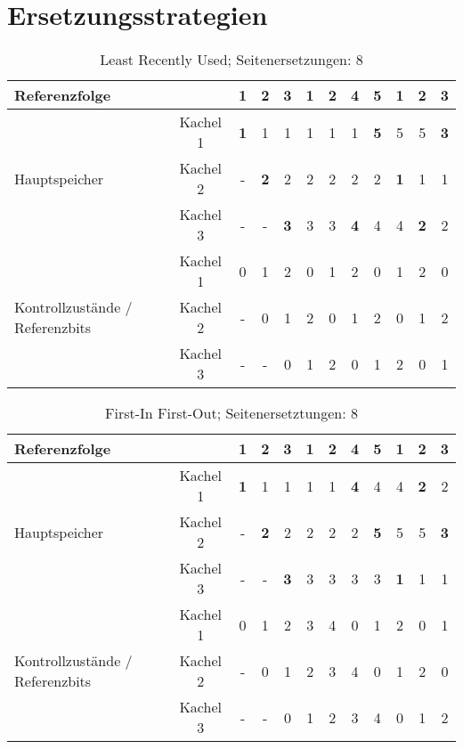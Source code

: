 \documentclass[DIN, pagenumber=false, fontsize=11pt, parskip=half]{scrartcl}
\begin{document}
    \section{Ersetzungsstrategien}
    \begin{table}[H]
        \centering
        \begin{tabular}{lc|c|c|c|c|c|c|c|c|c|c}
            \toprule
            Referenzfolge & & 1 & 2 & 3 & 1 & 2 & 4 & 5 & 1 & 2 & 3 \\
            \midrule
            \multirow{3}{*}{Hauptspeicher} & Kachel 1  & \textbf{1} & 1 & 1 & 1 & 1 & 1 & \textbf{5} & 5 & 5 & \textbf{3}\\
            & Kachel 2 & - & \textbf{2} & 2 & 2 & 2 & 2 & 2 & \textbf{1} & 1 & 1\\
            & Kachel 3 & - & - & \textbf{3} & 3 & 3 & \textbf{4} & 4 & 4 & \textbf{2} & 2\\
            \midrule
            \multirow{3}{3cm}{Kontrollzustände / Referenzbits} & Kachel 1 & 0 & 1 & 2 & 0 & 1 & 2 & 0 & 1 & 2 & 0\\
            & Kachel 2 & - & 0 & 1 & 2 & 0 & 1 & 2 & 0 & 1 & 2\\
            & Kachel 3 & - & - & 0 & 1 & 2 & 0 & 1 & 2 & 0 & 1\\
            \bottomrule
        \end{tabular}
        \caption{Least Recently Used; Seitenersetzungen: 8}
    \end{table}
    \begin{table}[H]
        \centering
        \begin{tabular}{lc|c|c|c|c|c|c|c|c|c|c}
            \toprule
            Referenzfolge & & 1 & 2 & 3 & 1 & 2 & 4 & 5 & 1 & 2 & 3 \\
            \midrule
            \multirow{3}{*}{Hauptspeicher} & Kachel 1  & \textbf{1} & 1 & 1 & 1 & 1 & \textbf{4} & 4 & 4 & \textbf{2} & 2\\
            & Kachel 2 & - & \textbf{2} & 2 & 2 & 2 & 2 & \textbf{5} & 5 & 5 & \textbf{3}\\
            & Kachel 3 & - & - & \textbf{3} & 3 & 3 & 3 & 3 & \textbf{1} & 1 & 1\\
            \midrule
            \multirow{3}{3cm}{Kontrollzustände / Referenzbits} & Kachel 1 & 0 & 1 & 2 & 3 & 4 & 0 & 1 & 2 & 0 & 1\\
            & Kachel 2 & - & 0 & 1 & 2 & 3 & 4 & 0 & 1 & 2 & 0\\
            & Kachel 3 & - & - & 0 & 1 & 2 & 3 & 4 & 0 & 1 & 2\\
            \bottomrule
        \end{tabular}
        \caption{First-In First-Out; Seitenersetztungen: 8}
    \end{table}
\end{document}
